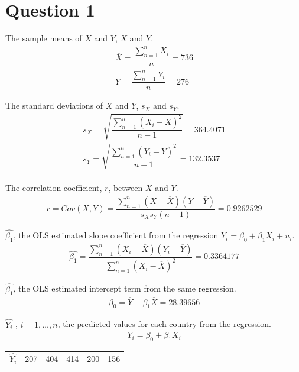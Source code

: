 \documentclass[12pt]{article}
\begin{document}
\section{Question 1}
\begin{list}{)~}{}
\item The sample means of $X$ and $Y$, $\overline{X}$ and $\overline{Y}$.
\begin{gather*}
\overline{X} = \dfrac{\sum\limits_{n=1}^{n}{X_i}}{n} = 736\\
\overline{Y} = \dfrac{\sum\limits_{n=1}^{n}{Y_i}}{n} = 276
\end{gather*}
\item  The standard deviations of $X$ and $Y$, $s_X$ and $s_Y$.
\begin{gather*}
s_X = \sqrt{\dfrac{\sum\limits_{n=1}^{n}{\left(X_i - \overline{X}\right)^2}}{n-1}} = 364.4071\\
s_Y = \sqrt{\dfrac{\sum\limits_{n=1}^{n}{\left(Y_i - \overline{Y}\right)^2}}{n-1}} = 132.3537\\
\end{gather*}
\item The correlation coefficient, $r$, between $X$ and $Y$.
\begin{gather*}
r = Cov(X, Y) = \dfrac{\sum\limits_{n=1}^{n}{(X-\overline{X})(Y-\overline{Y})}}{s_Xs_Y(n-1)} =  0.9262529
\end{gather*}
\item $\hat{\beta_1}$, the OLS estimated slope coefficient from the regression $Y_i = \beta_0 + \beta_1X_i + u_i$.
\begin{gather*}
\hat{\beta_1} = \dfrac{\sum\limits_{n=1}^{n}{\left(X_i - \overline{X}\right)\left(Y_i - \overline{Y}\right)}}{\sum\limits_{n=1}^{n}{\left(X_i - \overline{X}\right)^2}} = 0.3364177
\end{gather*}
\item $\hat{\beta_1}$, the OLS estimated intercept term from the same regression.
\begin{gather*}
\beta_0 = \overline{Y} - \beta_1\overline{X} = 28.39656
\end{gather*}
\item $\hat{Y_i}$ , $i = 1,…,n$, the predicted values for each country from the regression.
\begin{gather*}
Y_i = \beta_0 + \beta_1X_i
\end{gather*}
\begin{center}
	\begin{tabular}{|c|c|c|c|c|c|}
		$\hat{Y_i}$ & 207 & 404 & 414 & 200 & 156\\

\end{tabular}
\end{center}
\end{list}
\end{document}
